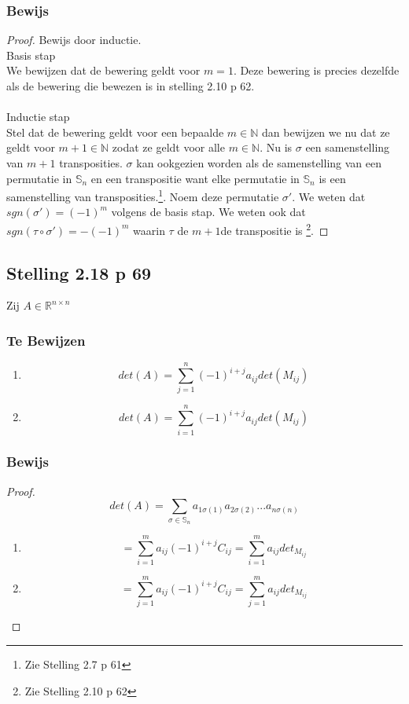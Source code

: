 \documentclass[lineaire_algebra_oplossingen.tex]{subfiles}
\begin{document}
\subsubsection*{Bewijs}
\begin{proof}
Bewijs door inductie.\\
\textsf{Basis stap}\\
We bewijzen dat de bewering geldt voor $m=1$. Deze bewering is precies dezelfde als de bewering die bewezen is in stelling 2.10 p 62.\\\\
\textsf{Inductie stap}\\
Stel dat de bewering geldt voor een bepaalde $m \in \mathbb{N}$ dan bewijzen we nu dat ze geldt voor $m+1 \in \mathbb{N}$ zodat ze geldt voor alle $m \in \mathbb{N}$.
Nu is $\sigma$ een samenstelling van $m+1$ transposities. $\sigma$ kan ookgezien worden als de samenstelling van een permutatie in $\mathbb{S}_n$ en een transpositie want elke permutatie in $\mathbb{S}_n$ is een samenstelling van transposities.\footnote{Zie Stelling 2.7 p 61}. Noem deze permutatie $\sigma'$. We weten dat $sgn(\sigma') = (-1)^m$ volgens de basis stap. We weten ook dat $sgn(\tau \circ \sigma') = -(-1)^m$ waarin $\tau$ de $m+1$de transpositie is \footnote{Zie Stelling 2.10 p 62}.
\end{proof}

\subsection{Stelling 2.18 p 69}
Zij $A \in \mathbb{R}^{n\times n}$
\subsubsection*{Te Bewijzen}
\begin{enumerate}
\item
\[
det(A) = \sum_{j=1}^n(-1)^{i+j}a_{ij}det(M_{ij})
\]
\item
\[
det(A) = \sum_{i=1}^n(-1)^{i+j}a_{ij}det(M_{ij})
\]
\end{enumerate}
\subsubsection*{Bewijs}
\begin{proof}
\[
det(A) = \sum_{\sigma \in \mathbb{S}_n} a_{1\sigma(1)}a_{2\sigma(2)}...a_{n\sigma(n)}
\]
\begin{enumerate}
\item
\[
= \sum_{i=1}^m a_{ij} (-1)^{i+j}C_{ij}
= \sum_{i=1}^m a_{ij} det_{M_{ij}}
\]
\item
\[
= \sum_{j=1}^m a_{ij} (-1)^{i+j}C_{ij}
= \sum_{j=1}^m a_{ij} det_{M_{ij}}
\]
\end{enumerate}
\end{proof}
\end{document}
